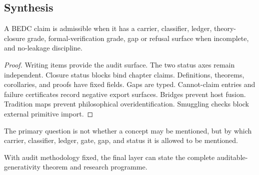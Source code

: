 \subsection{Synthesis}
\label{subsec:philosophy-audit-methodology-synthesis}

\begin{theorem}
\label{thm:philosophy-audit-methodology-synthesis}
A BEDC claim is admissible when it has a carrier, classifier, ledger,
theory-closure grade, formal-verification grade, gap or refusal surface
when incomplete, and no-leakage discipline.
\end{theorem}
\begin{proof}
Writing items provide the audit surface. The two status axes remain
independent. Closure status blocks bind chapter claims. Definitions,
theorems, corollaries, and proofs have fixed fields. Gaps are typed.
Cannot-claim entries and failure certificates record negative export
surfaces. Bridges prevent host fusion. Tradition maps prevent
philosophical overidentification. Smuggling checks block external
primitive import.
\end{proof}

\begin{corollary}
\label{cor:philosophy-audit-first-writing-principle}
The primary question is not whether a concept may be mentioned, but by
which carrier, classifier, ledger, gate, gap, and status it is allowed
to be mentioned.
\end{corollary}

\begin{corollary}
\label{cor:philosophy-passage-final-synthesis}
With audit methodology fixed, the final layer can state the complete
auditable-generativity theorem and research programme.
\end{corollary}
